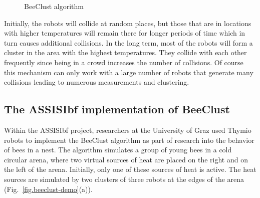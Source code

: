 \begin{figure}
\begin{center}
\end{center}
\caption{BeeClust algorithm}\label{fig.beeclust}
\end{figure}

Initially, the robots will collide at random places, but those that are in locations with higher temperatures will remain there for longer periods of time which in turn causes additional collisions. In the long term, most of the robots will form a cluster in the area with the highest temperatures. They collide with each other frequently since being in a crowd increases the number of collisions. Of course this mechanism can only work with a large number of robots that generate many collisions leading to numerous measurements and clustering. 

\subsection{The ASSISIbf implementation of BeeClust}

Within the ASSISIbf project, researchers at the University of Graz used Thymio robots to implement the BeeClust algorithm as part of research into the behavior of bees in a nest. The algorithm simulates a group of young bees in a cold circular arena, where two virtual sources of heat are placed on the right and on the left of the arena. Initially, only one of these sources of heat is active. The heat sources are simulated by two clusters of three robots at the edges of the arena (Fig.~\ref{fig.beeclust-demo}(a)).


